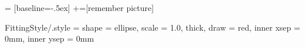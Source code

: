  = [baseline=-.5ex]
+=[remember picture]


\tikzset
{
  FittingStyle/.style =
  {
    shape = ellipse,                            %
    scale           = 1.0,                  %
    thick,                                  %
    draw            = red,              %
    inner xsep      = 0mm,                  %
    inner ysep      = 0mm                   %
  }
}


